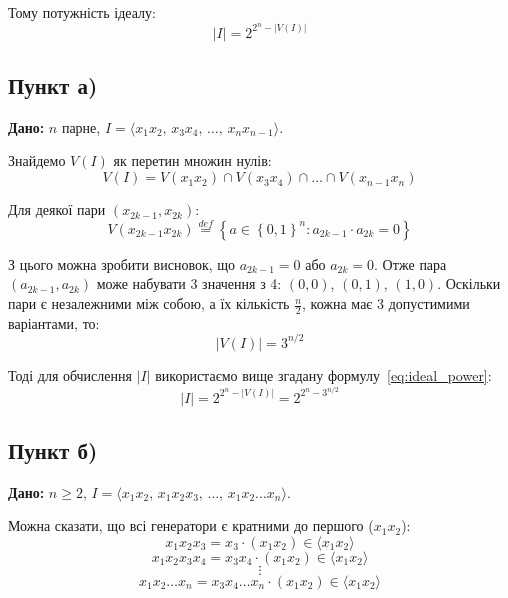 Тому потужність ідеалу:
\begin{equation}
    \label{eq:ideal_power}
    |I| = 2^{2^n - |V(I)|}
\end{equation}

\subsection{Пункт а)}

\textbf{Дано:} $n$ парне, $I = \langle x_{1}x_{2}, \, x_{3}x_{4}, \, \ldots, \, x_{n}x_{n-1} \rangle$.

Знайдемо $V(I)$ як перетин множин нулів:
\begin{equation*}
    V(I) = V(x_1 x_2) \cap V(x_3 x_4) \cap \ldots \cap V(x_{n-1} x_n)
\end{equation*}

Для деякої пари $(x_{2k-1}, x_{2k})$:
\begin{equation*}
    V(x_{2k-1} x_{2k}) \overset{def}{=} \left\{a \in \left\{0,1\right\}^n : a_{2k-1} \cdot a_{2k} = 0\right\}
\end{equation*}

З цього можна зробити висновок, що $a_{2k-1} = 0$ або $a_{2k} = 0$. Отже пара $(a_{2k-1}, a_{2k})$ може набувати 
3 значення з 4: $(0, 0)$, $(0, 1)$, $(1, 0)$. Оскільки пари є незалежними між собою, а їх кількість $\frac{n}{2}$, 
кожна має 3 допустимими варіантами, то:
\begin{equation*}
    |V(I)| = 3^{n/2}
\end{equation*}

Тоді для обчислення $|I|$ використаємо вище згадану формулу~\eqref{eq:ideal_power}:
\begin{equation*}
    |I| = 2^{2^n - |V(I)|} = 2^{2^n - 3^{n/2}}
\end{equation*}

\subsection{Пункт б)}

\textbf{Дано:} $n \geq 2$, $I = \langle x_{1}x_{2}, \, x_{1}x_{2}x_{3}, \, \ldots , \, x_{1}x_{2} \ldots x_{n}\rangle$.

Можна сказати, що всі генератори є кратними до першого ($x_1 x_2$):
\begin{equation*}
    x_1 x_2 x_3 = x_3 \cdot (x_1 x_2) \in \langle x_1 x_2 \rangle
\end{equation*}
\begin{equation*}
    x_1 x_2 x_3 x_4 = x_3 x_4 \cdot (x_1 x_2) \in \langle x_1 x_2 \rangle
\end{equation*}
\begin{equation*}
    \vdots
\end{equation*}
\begin{equation*}
    x_1 x_2 \ldots x_n = x_3 x_4 \ldots x_n \cdot (x_1 x_2) \in \langle x_1 x_2 \rangle
\end{equation*}

